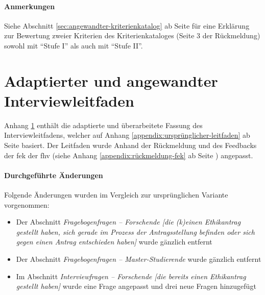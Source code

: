 \documentclass[a4paper,12pt,twoside]{scrreprt}
\begin{document}
\subsubsection*{Anmerkungen}
\label{appendix:anmerkungen-rückmeldung-fek}

Siehe Abschnitt \ref{sec:angewandter-kriterienkatalog} ab Seite \pageref{sec:angewandter-kriterienkatalog} für eine Erklärung zur Bewertung zweier Kriterien des Kriterienkataloges (Seite 3 der Rückmeldung) sowohl mit \enquote{Stufe I} als auch mit \enquote{Stufe II}.



\cleardoublepage
\chapter{Adaptierter und angewandter Interviewleitfaden}
\label{appendix:interview-leitfaden}

Anhang \ref{appendix:interview-leitfaden} enthält die adaptierte und überarbeitete Fassung des Interviewleitfadens, welcher auf Anhang \ref{appendix:ursprünglicher-leitfaden} ab Seite \pageref{appendix:ursprünglicher-leitfaden} basiert. Der Leitfaden wurde Anhand der Rückmeldung und des Feedbacks der \acl{fek} der \acl{fhv} (siehe Anhang \ref{appendix:rückmeldung-fek} ab Seite \pageref{appendix:rückmeldung-fek}) angepasst.

\subsubsection*{Durchgeführte Änderungen}
\label{appendix:änderungen-interview-leitfaden}

Folgende Änderungen wurden im Vergleich zur ursprünglichen Variante vorgenommen:
\begin{itemize}
    \item Der Abschnitt \textit{Fragebogenfragen -- Forschende [die (k)einen Ethikantrag gestellt haben, sich gerade im Prozess der Antragsstellung befinden oder sich gegen einen Antrag entschieden haben]} wurde gänzlich entfernt
    \item Der Abschnitt \textit{Fragebogenfragen -- Master-Studierende} wurde gänzlich entfernt
    \item Im Abschnitt \textit{Interviewfragen -- Forschende [die bereits einen Ethikantrag gestellt haben]} wurde eine Frage angepasst und drei neue Fragen hinzugefügt
\end{itemize}
\end{document}
